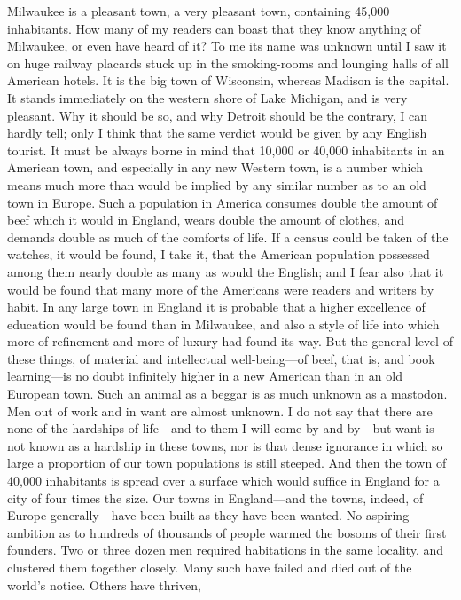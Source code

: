 Milwaukee is a pleasant town, a very pleasant town, containing
45,000 inhabitants.  How many of my readers can boast that they
know anything of Milwaukee, or even have heard of it?  To me its
name was unknown until I saw it on huge railway placards stuck up
in the smoking-rooms and lounging halls of all American hotels.  It
is the big town of Wisconsin, whereas Madison is the capital.  It
stands immediately on the western shore of Lake Michigan, and is
very pleasant.  Why it should be so, and why Detroit should be the
contrary, I can hardly tell; only I think that the same verdict
would be given by any English tourist.  It must be always borne in
mind that 10,000 or 40,000 inhabitants in an American town, and
especially in any new Western town, is a number which means much
more than would be implied by any similar number as to an old town
in Europe.  Such a population in America consumes double the amount
of beef which it would in England, wears double the amount of
clothes, and demands double as much of the comforts of life.  If a
census could be taken of the watches, it would be found, I take it,
that the American population possessed among them nearly double as
many as would the English; and I fear also that it would be found
that many more of the Americans were readers and writers by habit.
In any large town in England it is probable that a higher
excellence of education would be found than in Milwaukee, and also
a style of life into which more of refinement and more of luxury
had found its way.  But the general level of these things, of
material and intellectual well-being---of beef, that is, and book
learning---is no doubt infinitely higher in a new American than in
an old European town.  Such an animal as a beggar is as much
unknown as a mastodon.  Men out of work and in want are almost
unknown.  I do not say that there are none of the hardships of
life---and to them I will come by-and-by---but want is not known as a
hardship in these towns, nor is that dense ignorance in which so
large a proportion of our town populations is still steeped.  And
then the town of 40,000 inhabitants is spread over a surface which
would suffice in England for a city of four times the size.  Our
towns in England---and the towns, indeed, of Europe generally---have
been built as they have been wanted.  No aspiring ambition as to
hundreds of thousands of people warmed the bosoms of their first
founders.  Two or three dozen men required habitations in the same
locality, and clustered them together closely.  Many such have
failed and died out of the world's notice.  Others have thriven,
